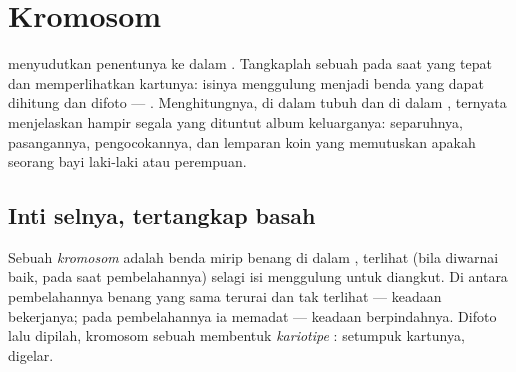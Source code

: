 \chapter{Kromosom}\label{ch:g9:chromosomes}

 menyudutkan
penentunya ke dalam . Tangkaplah sebuah  pada
saat yang tepat dan  memperlihatkan kartunya:
isinya menggulung menjadi benda yang dapat dihitung dan
difoto --- . Menghitungnya, di dalam  tubuh
dan di dalam , ternyata menjelaskan hampir segala
yang dituntut album keluarganya: separuhnya, pasangannya,
pengocokannya, dan lemparan koin yang memutuskan apakah
seorang bayi laki-laki atau perempuan.

\section{Inti selnya, tertangkap basah}

\begin{definition}[Kromosom]\label{def:g9:chromosomes:chromosomes}
Sebuah \emph{kromosom} adalah benda mirip
benang di dalam , terlihat (bila diwarnai baik,
pada saat pembelahannya) selagi isi  menggulung
untuk diangkut. Di antara pembelahannya benang yang sama
terurai dan tak terlihat --- keadaan bekerjanya; pada
pembelahannya ia memadat --- keadaan berpindahnya. Difoto
lalu dipilah, kromosom sebuah  membentuk
\emph{kariotipe} : setumpuk kartunya,
digelar.
\end{definition}

